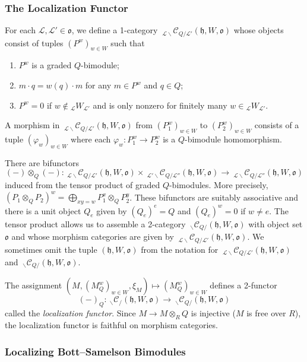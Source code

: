 \documentclass{amsart}
\newcommand{\scrL}{\mathcal{L}}
\newcommand{\fr}[1]{\mathfrak{#1}}
\newcommand{\Cmon}[2]{\:_{#1 \backslash} \mathcal{C}_{/ #2} }
\newcommand{\CmonQ}[2]{\:_{#1 \backslash} \mathcal{C}_{Q / #2} }
\newcommand{\W}[2]{{}_{#1}W_{#2}}
\theoremstyle{definition}
\numberwithin{equation}{subsection}
\begin{document}
\subsubsection{The Localization Functor}

For each $\scrL, \scrL' \in \fr{o}$, we define a 1-category $\CmonQ{\scrL}{\scrL'} (\fr{h}, W, \fr{o})$ whose objects consist of tuples $(P^w)_{w \in W}$ such that
\begin{enumerate}
    \item $P^w$ is a graded $Q$-bimodule;
    \item $m \cdot q = w (q) \cdot m$ for any $m \in P^w$ and $q \in Q$;
    \item $P^w = 0$ if $w \notin \W{\scrL}{\scrL'}$ and is only nonzero for finitely many $w \in \W{\scrL}{\scrL'}$.
\end{enumerate}
A morphism in $\CmonQ{\scrL}{\scrL'} (\fr{h}, W, \fr{o})$ from $(P_1^w)_{w \in W}$ to $(P_2^w)_{w \in W}$ consists of a tuple $(\varphi_w)_{w \in W}$ where each $\varphi_w : P_1^w \to P_2^w$ is a $Q$-bimodule homomorphism.

There are bifunctors
\[(-) \otimes_Q (-) : \CmonQ{\scrL}{\scrL'} (\fr{h}, W, \fr{o}) \times \CmonQ{\scrL'}{\scrL''} (\fr{h}, W, \fr{o}) \to \CmonQ{\scrL}{\scrL''} (\fr{h}, W, \fr{o})\]
induced from the tensor product of graded $Q$-bimodules. More precisely, $(P_1 \otimes_Q P_2)^w = \bigoplus_{xy = w} P_1^x \otimes_Q P_2^y$.
These bifunctors are suitably associative and there is a unit object $Q_e$ given by $(Q_e)^e = Q$ and $(Q_e)^w = 0$ if $w \neq e$.
The tensor product allows us to assemble a 2-category $\CmonQ{}{} (\fr{h}, W, \fr{o})$ with object set $\fr{o}$ and whose morphism categories are given by $\CmonQ{\scrL}{\scrL'} (\fr{h}, W, \fr{o})$.
We sometimes omit the tuple $(\fr{h}, W, \fr{o})$ from the notation for $\CmonQ{\scrL}{\scrL'} (\fr{h}, W, \fr{o})$ and $\CmonQ{}{} (\fr{h}, W, \fr{o})$.

The assignment $(M, (M_Q^w)_{w \in W}, \xi_M) \mapsto (M_Q^w)_{w \in W}$ defines a 2-functor 
\[(-)_Q : \Cmon{}{} (\fr{h}, W, \fr{o}) \to \CmonQ{}{} (\fr{h}, W, \fr{o})\]
called the \emph{localization functor}.
Since $M \to M \otimes_R Q$ is injective ($M$ is free over $R$), the localization functor is faithful on morphism categories.

\subsubsection{Localizing Bott--Samelson Bimodules}
\end{document}
